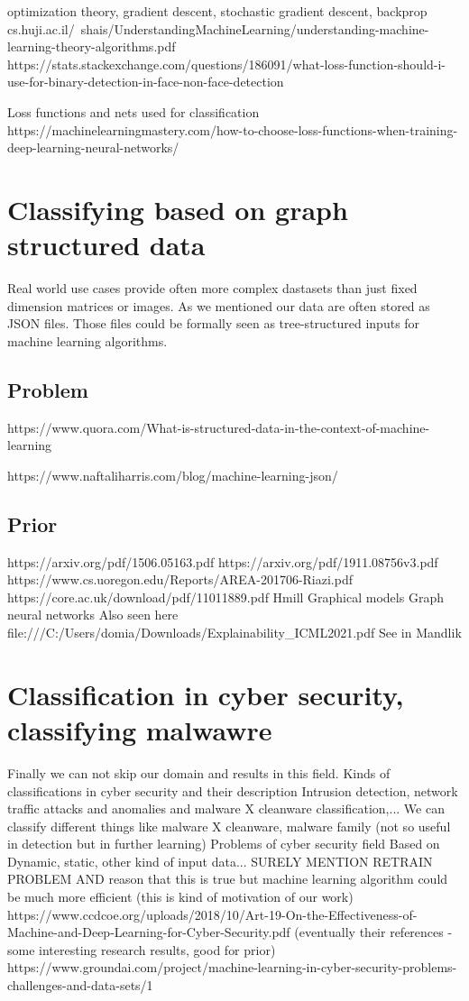optimization theory, gradient descent, stochastic gradient descent, backprop
cs.huji.ac.il/~shais/UnderstandingMachineLearning/understanding-machine-learning-theory-algorithms.pdf
https://stats.stackexchange.com/questions/186091/what-loss-function-should-i-use-for-binary-detection-in-face-non-face-detection

Loss functions and nets used for classification
https://machinelearningmastery.com/how-to-choose-loss-functions-when-training-deep-learning-neural-networks/

\section{Classifying based on graph structured data}
Real world use cases provide often more complex dastasets than just fixed dimension matrices or images. As we mentioned our data are often stored as JSON files. Those files could be formally seen as tree-structured inputs for machine learning algorithms. 
\subsection{Problem}
https://www.quora.com/What-is-structured-data-in-the-context-of-machine-learning

https://www.naftaliharris.com/blog/machine-learning-json/

\subsection{Prior}
https://arxiv.org/pdf/1506.05163.pdf
https://arxiv.org/pdf/1911.08756v3.pdf
https://www.cs.uoregon.edu/Reports/AREA-201706-Riazi.pdf
https://core.ac.uk/download/pdf/11011889.pdf
Hmill
Graphical models
Graph neural networks
    Also seen here file:///C:/Users/domia/Downloads/Explainability_ICML2021.pdf
See in Mandlik

\section{Classification in cyber security, classifying malwawre}
Finally we can not skip our domain and results in this field. 
Kinds of classifications in cyber security and their description
Intrusion detection, network traffic attacks and anomalies and malware X cleanware classification,...
We can classify different things like malware X cleanware, malware family (not so useful in detection but in further learning)
Problems of cyber security field
Based on Dynamic, static, other kind of input data...
SURELY MENTION RETRAIN PROBLEM AND reason that this is true but machine learning algorithm could be much more efficient (this is kind of motivation of our work)
https://www.ccdcoe.org/uploads/2018/10/Art-19-On-the-Effectiveness-of-Machine-and-Deep-Learning-for-Cyber-Security.pdf (eventually their references - some interesting research results, good for prior)
https://www.groundai.com/project/machine-learning-in-cyber-security-problems-challenges-and-data-sets/1

